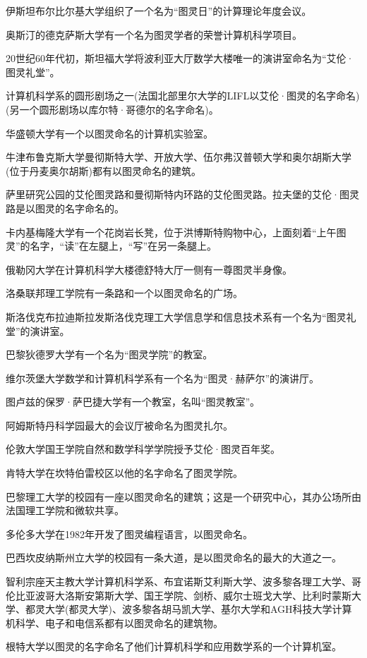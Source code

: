 伊斯坦布尔比尔基大学组织了一个名为“图灵日”的计算理论年度会议。

奥斯汀的德克萨斯大学有一个名为图灵学者的荣誉计算机科学项目。

20世纪60年代初，斯坦福大学将波利亚大厅数学大楼唯一的演讲室命名为“艾伦·图灵礼堂”。

计算机科学系的圆形剧场之一(法国北部里尔大学的LIFL以艾伦·图灵的名字命名)(另一个圆形剧场以库尔特·哥德尔的名字命名)。

华盛顿大学有一个以图灵命名的计算机实验室。

牛津布鲁克斯大学曼彻斯特大学、开放大学、伍尔弗汉普顿大学和奥尔胡斯大学(位于丹麦奥尔胡斯)都有以图灵命名的建筑。

萨里研究公园的艾伦图灵路和曼彻斯特内环路的艾伦图灵路。拉夫堡的艾伦·图灵路是以图灵的名字命名的。

卡内基梅隆大学有一个花岗岩长凳，位于洪博斯特购物中心，上面刻着“上午图灵”的名字，“读”在左腿上，“写”在另一条腿上。

俄勒冈大学在计算机科学大楼德舒特大厅一侧有一尊图灵半身像。

洛桑联邦理工学院有一条路和一个以图灵命名的广场。

斯洛伐克布拉迪斯拉发斯洛伐克理工大学信息学和信息技术系有一个名为“图灵礼堂”的演讲室。

巴黎狄德罗大学有一个名为“图灵学院”的教室。

维尔茨堡大学数学和计算机科学系有一个名为“图灵·赫萨尔”的演讲厅。

图卢兹的保罗·萨巴捷大学有一个教室，名叫“图灵教室”。

阿姆斯特丹科学园最大的会议厅被命名为图灵扎尔。

伦敦大学国王学院自然和数学科学学院授予艾伦·图灵百年奖。

肯特大学在坎特伯雷校区以他的名字命名了图灵学院。

巴黎理工大学的校园有一座以图灵命名的建筑；这是一个研究中心，其办公场所由法国理工学院和微软共享。

多伦多大学在1982年开发了图灵编程语言，以图灵命名。

巴西坎皮纳斯州立大学的校园有一条大道，是以图灵命名的最大的大道之一。

智利宗座天主教大学计算机科学系、布宜诺斯艾利斯大学、波多黎各理工大学、哥伦比亚波哥大洛斯安第斯大学、国王学院、剑桥、威尔士班戈大学、比利时蒙斯大学、都灵大学(都灵大学)、波多黎各胡马凯大学、基尔大学和AGH科技大学计算机科学、电子和电信系都有以图灵命名的建筑物。

根特大学以图灵的名字命名了他们计算机科学和应用数学系的一个计算机室。

